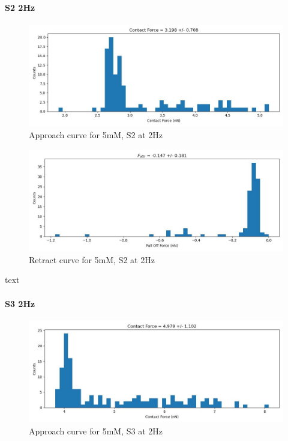 \paragraph{S2 2Hz}
\begin{figure}[h!]
\centering
\includegraphics[width=\textwidth]{chapter7/Tip speed/5mM/S2 2Hz/approach_f_c_hist.jpg}
\caption{Approach curve for 5mM, S2 at 2Hz}
\end{figure}

\begin{figure}[h!]
\centering
\includegraphics[width=\textwidth]{chapter7/Tip speed/5mM/S2 2Hz/retract_f_a_hist.jpg}
\caption{Retract curve for 5mM, S2 at 2Hz}
\end{figure}
text
\newpage

\paragraph{S3 2Hz}
\begin{figure}[h!]
\centering
\includegraphics[width=\textwidth]{chapter7/Tip speed/5mM/S3 2Hz/approach_f_c_hist.jpg}
\caption{Approach curve for 5mM, S3 at 2Hz}
\end{figure}

